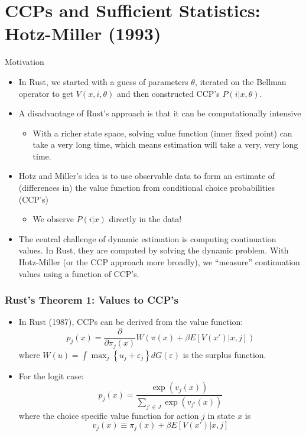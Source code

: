 \documentclass[xcolor=pdftex,dvipsnames,table,mathserif]{beamer}
\begin{document}
\section{CCPs and Sufficient Statistics: Hotz-Miller (1993)}


\begin{frame}{Motivation}
\begin{itemize}
	\item In Rust, we started with a guess of parameters $\theta$, iterated on the Bellman operator to get $V(x,i,\theta)$ and then constructed CCP's $P(i | x, \theta)$.
	\item A disadvantage of Rust's approach is that it can be computationally intensive
	\begin{itemize}
	
		\item With a richer state space, solving value function (inner fixed point) 
		can take a very long time,
		which means estimation will take a very, very long time.
	\end{itemize}
	\item Hotz and Miller's idea is to use observable data to form an estimate 
	of (differences in) the value function from conditional choice probabilities (CCP's)
\begin{itemize}
\item We observe $P(i | x)$ directly in the data!
\end{itemize}
	
	\item The central challenge of dynamic estimation is computing continuation values. 
	In Rust, they are computed by solving the dynamic problem.
	With Hotz-Miller (or the CCP approach more broadly), we ``measure'' continuation
	values using a function of CCP's.
	
\end{itemize}
\end{frame}

\begin{frame}
\frametitle{Rust's Theorem 1: Values to CCP's}
\begin{itemize}
	\item In Rust (1987), CCPs can be derived from the value function:\[
		p_{j}\left( x\right) = \frac{\partial}{\partial \pi_{j} \left(x \right)} W\left( \pi\left( x \right) 
		+\beta E\left[V\left(x' \right)|x,j\right]\right)
	\]
	where  $W\left(u\right) = \int \max_{j} \left\{ u_{j} +\varepsilon_{j}\right\}dG\left( \varepsilon\right)$ is the surplus function.

	\medskip
	\item For the logit case:\[
	p_{j}\left(x\right) = \frac{\exp\left(v_{j}\left(x\right)\right)}{\sum_{j'\in J}\exp\left(v_{j'}\left(x\right)\right)}
	\]
	where the choice specific value function for action $j$ in state $x$ is \[
	v_{j}\left(x\right) \equiv \pi_{j}\left(x\right)+\beta E\left[V\left(x' \right)|x,j\right]
	\]
\end{itemize}
\end{frame}
\end{document}
